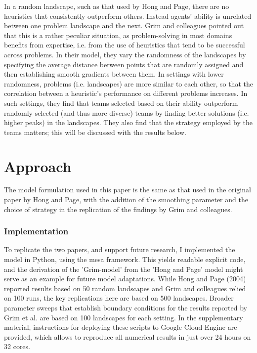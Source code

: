 In a random landscape, such as that used by Hong and Page, there are no heuristics that consistently outperform others. Instead agents' ability is unrelated between one problem landscape and the next. Grim and colleagues pointed out that this is a rather peculiar situation, as problem-solving in most domains benefits from expertise, i.e. from the use of heuristics that tend to be successful across problems. In their model, they vary the randomness of the landscapes by specifying the average distance between points that are randomly assigned and then establishing smooth gradients between them. In settings with lower randomness, problems (i.e. landscapes) are more similar to each other, so that the correlation between a heuristic's performance on different problems increases. In such settings, they find that teams selected based on their ability outperform randomly selected (and thus more diverse) teams by finding better solutions (i.e. higher peaks) in the landscapes. They also find that the strategy employed by the teams matters; this will be discussed with the results below.

\section{Approach}

The model formulation used in this paper is the same as that used in the original paper by Hong and Page, with the addition of the smoothing parameter and the choice of strategy in the replication of the findings by Grim and colleagues.

\subsubsection{Implementation}

To replicate the two papers, and support future research, I implemented the model in Python, using the mesa framework.\supercite{kazil2020utilizing} This yields readable explicit code, and the derivation of the 'Grim-model' from the 'Hong and Page' model might serve as an example for future model adaptations. While Hong and Page (2004) reported results based on 50 random landscapes and Grim and colleagues relied on 100 runs, the key replications here are based on 500 landscapes. Broader parameter sweeps that establish boundary conditions for the results reported by Grim et al. are based on 100 landscapes for each setting. In the supplementary material, instructions for deploying these scripts to Google Cloud Engine are provided, which allows to reproduce all numerical results in just over 24 hours on 32 cores.

